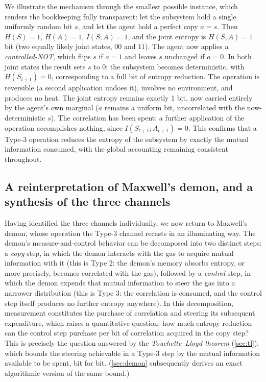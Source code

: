 \documentclass[11pt]{article}
\begin{document}
\begin{example}
\label{ex:cnot}
We illustrate the mechanism through the smallest possible instance, which renders the bookkeeping fully transparent: let the subsystem hold a single uniformly random bit $s$, and let the agent hold a perfect copy $a = s$. Then $H(S) = 1$, $H(A) = 1$, $I(S;A) = 1$, and the joint entropy is $H(S, A) = 1$ bit (two equally likely joint states, $00$ and $11$). The agent now applies a \emph{controlled-NOT}, which flips $s$ if $a = 1$ and leaves $s$ unchanged if $a = 0$. In both joint states the result sets $s$ to $0$: the subsystem becomes deterministic, with $H(S_{t+1}) = 0$, corresponding to a full bit of entropy reduction. The operation is reversible (a second application undoes it), involves no environment, and produces no heat. The joint entropy remains exactly 1 bit, now carried entirely by the agent's own marginal ($a$ remains a uniform bit, uncorrelated with the now-deterministic $s$). The correlation has been spent: a further application of the operation accomplishes nothing, since $I(S_{t+1}; A_{t+1}) = 0$. This confirms that a Type-3 operation reduces the entropy of the subsystem by exactly the mutual information consumed, with the global accounting remaining consistent throughout.
\end{example}

\subsection{A reinterpretation of Maxwell's demon, and a synthesis of the three channels}
\label{sec:demonreframe}

Having identified the three channels individually, we now return to Maxwell's demon, whose operation the Type-3 channel recasts in an illuminating way. The demon's measure-and-control behavior can be decomposed into two distinct steps: a \emph{copy} step, in which the demon interacts with the gas to acquire mutual information with it (this is Type 2: the demon's memory absorbs entropy, or more precisely, becomes correlated with the gas), followed by a \emph{control} step, in which the demon expends that mutual information to steer the gas into a narrower distribution (this is Type 3: the correlation is consumed, and the control step itself produces no further entropy anywhere). In this decomposition, measurement constitutes the purchase of correlation and steering its subsequent expenditure, which raises a quantitative question: how much entropy reduction can the control step purchase per bit of correlation acquired in the copy step? This is precisely the question answered by the \emph{Touchette--Lloyd theorem} (\cref{sec:tl}), which bounds the steering achievable in a Type-3 step by the mutual information available to be spent, bit for bit. (\cref{sec:demon} subsequently derives an exact algorithmic version of the same bound.)
\end{document}
